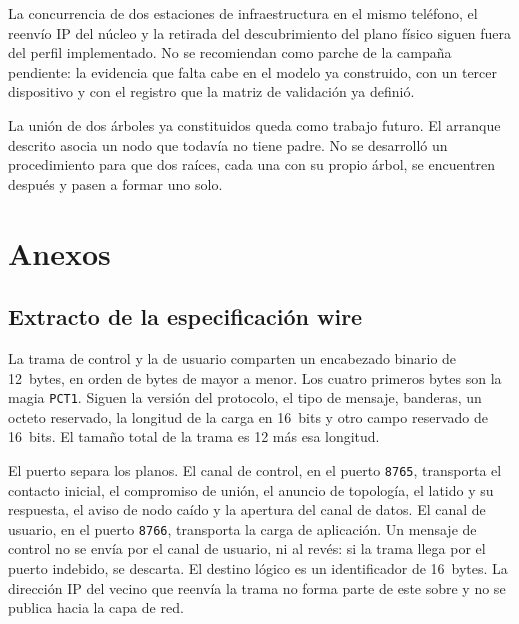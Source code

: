 \documentclass[12pt,oneside]{scrreprt}
\begin{document}
La concurrencia de dos estaciones de infraestructura en el mismo teléfono, el reenvío IP del núcleo y la retirada del descubrimiento del plano físico siguen fuera del perfil implementado. No se recomiendan como parche de la campaña pendiente: la evidencia que falta cabe en el modelo ya construido, con un tercer dispositivo y con el registro que la matriz de validación ya definió.

La unión de dos árboles ya constituidos queda como trabajo futuro. El arranque descrito asocia un nodo que todavía no tiene padre. No se desarrolló un procedimiento para que dos raíces, cada una con su propio árbol, se encuentren después y pasen a formar uno solo.

\iffalse
\chapter{Anexos}
\label{ch:anexos}
\section{Extracto de la especificación wire}
La trama de control y la de usuario comparten un encabezado binario de 12~bytes, en orden de bytes de mayor a menor. Los cuatro primeros bytes son la magia \texttt{PCT1}. Siguen la versión del protocolo, el tipo de mensaje, banderas, un octeto reservado, la longitud de la carga en 16~bits y otro campo reservado de 16~bits. El tamaño total de la trama es 12 más esa longitud.

El puerto separa los planos. El canal de control, en el puerto \texttt{8765}, transporta el contacto inicial, el compromiso de unión, el anuncio de topología, el latido y su respuesta, el aviso de nodo caído y la apertura del canal de datos. El canal de usuario, en el puerto \texttt{8766}, transporta la carga de aplicación. Un mensaje de control no se envía por el canal de usuario, ni al revés: si la trama llega por el puerto indebido, se descarta. El destino lógico es un identificador de 16~bytes. La dirección IP del vecino que reenvía la trama no forma parte de este sobre y no se publica hacia la capa de red.
\end{document}
